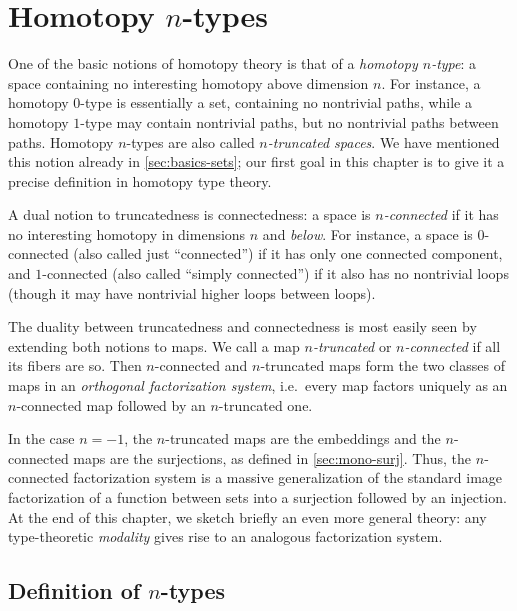 \chapter{Homotopy \texorpdfstring{$n$}{n}-types}
\label{cha:hlevels}

%

One of the basic notions of homotopy theory is that of a \emph{homotopy $n$-type}: a space containing no interesting homotopy above dimension $n$.
For instance, a homotopy $0$-type is essentially a set, containing no nontrivial paths, while a homotopy $1$-type may contain nontrivial paths, but no nontrivial paths between paths.
Homotopy $n$-types are also called \emph{$n$-truncated spaces}.
We have mentioned this notion already in \cref{sec:basics-sets}; our first goal in this chapter is to give it a precise definition in homotopy type theory.

A dual notion to truncatedness is connectedness: a space is \emph{$n$-connected} if it has no interesting homotopy in dimensions $n$ and \emph{below}.
For instance, a space is $0$-connected (also called just ``connected'') if it has only one connected component, and $1$-connected (also called ``simply connected'') if it also has no nontrivial loops (though it may have nontrivial higher loops between loops).

The duality between truncatedness and connectedness is most easily seen by extending both notions to maps.
We call a map \emph{$n$-truncated} or \emph{$n$-connected} if all its fibers are so.
Then $n$-connected and $n$-truncated maps form the two classes of maps in an \emph{orthogonal factorization system},
i.e.\ every map factors uniquely as an $n$-connected map followed by an $n$-truncated one.

In the case $n={-1}$, the $n$-truncated maps are the embeddings and the $n$-connected maps are the surjections, as defined in \cref{sec:mono-surj}.
Thus, the $n$-connected factorization system is a massive generalization of the standard image factorization of a function between sets into a surjection followed by an injection.
At the end of this chapter, we sketch briefly an even more general theory: any type-theoretic \emph{modality} gives rise to an analogous factorization system.


\section{Definition of \texorpdfstring{$n$}{n}-types}
\label{sec:n-types}

